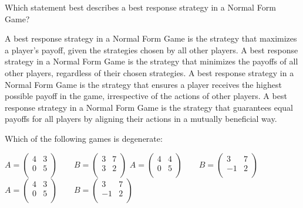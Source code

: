 \documentclass{exam}
\begin{document}
\begin{questions}
        
    \question Which statement best describes a best response strategy in a
    Normal Form Game?
\begin{checkboxes}
\choice A best response strategy in a Normal Form Game is the strategy that maximizes a player's payoff, given the strategies chosen by all other players.
\choice A best response strategy in a Normal Form Game is the strategy that minimizes the payoffs of all other players, regardless of their chosen strategies.
\choice A best response strategy in a Normal Form Game is the strategy that ensures a player receives the highest possible payoff in the game, irrespective of the actions of other players.
\choice A best response strategy in a Normal Form Game is the strategy that guarantees equal payoffs for all players by aligning their actions in a mutually beneficial way.
\end{checkboxes}

\question Which of the following games is degenerate:
    \begin{checkboxes}
        \choice
    \(
        A=\begin{pmatrix}4 & 3 \\
                       0 & 5 \\
        \end{pmatrix}
        \qquad
        B=\begin{pmatrix}3 & 7\\
                       3 & 2\\
        \end{pmatrix}
    \)
        \choice
    \(
        A=\begin{pmatrix}4 & 4 \\
                       0 & 5 \\
        \end{pmatrix}
        \qquad
        B=\begin{pmatrix}3 & 7\\
                       -1 & 2\\
        \end{pmatrix}
    \)
        \choice
    \(
        A=\begin{pmatrix}4 & 3 \\
                       0 & 5 \\
        \end{pmatrix}
        \qquad
        B=\begin{pmatrix}3 & 7\\
                       -1 & 2\\
        \end{pmatrix}
    \)
\end{checkboxes}


\end{questions}
\end{document}
